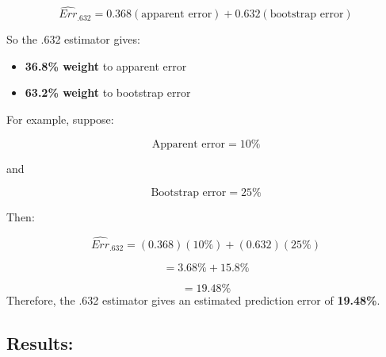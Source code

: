 \documentclass[
  letterpaper,
  DIV=11,
  numbers=noendperiod]{scrreprt}
\providecommand{\tightlist}{%
  \setlength{\itemsep}{0pt}\setlength{\parskip}{0pt}}
\begin{document}
\[
\widehat{Err}_{.632}
=
0.368(\text{apparent error})
+
0.632(\text{bootstrap error})
\]

So the .632 estimator gives:

\begin{itemize}
\tightlist
\item
  \textbf{36.8\% weight} to apparent error
\item
  \textbf{63.2\% weight} to bootstrap error
\end{itemize}

For example, suppose:

\[
\text{Apparent error} = 10\%
\]

and

\[
\text{Bootstrap error} = 25\%
\]

Then:

\[
\widehat{Err}_{.632}
=
(0.368)(10\%) + (0.632)(25\%)
\]

\[
= 3.68\% + 15.8\%
\]

\[
= 19.48\%
\] Therefore, the .632 estimator gives an estimated prediction error of
\textbf{19.48\%}.

\subsection{Results:}\label{results}
\end{document}
